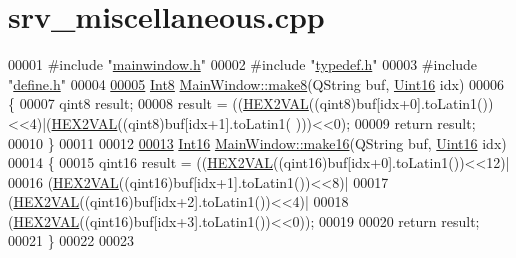 \hypertarget{a00135_source}{\section{srv\+\_\+miscellaneous.\+cpp}
\label{a00135_source}
}

\begin{DoxyCode}
00001 \textcolor{preprocessor}{#include "\hyperlink{a00110}{mainwindow.h}"}
00002 \textcolor{preprocessor}{#include "\hyperlink{a00004}{typedef.h}"}
00003 \textcolor{preprocessor}{#include "\hyperlink{a00090}{define.h}"}
00004 
\hypertarget{a00135_source_l00005}{}\hyperlink{a00017_aebce94d5e6af7afff661daf74b208de1}{00005} \hyperlink{a00004_aafb609548b1aa0152c46f9205b79d0f0}{Int8} \hyperlink{a00017_aebce94d5e6af7afff661daf74b208de1}{MainWindow::make8}(QString buf, \hyperlink{a00004_aae7407b021d43f7193a81a58cfb3e297}{Uint16} idx)
00006 \{
00007     qint8 result;
00008     result = ((\hyperlink{a00090_a428b04d2e2f2da2ea031a6c731660a71}{HEX2VAL}((qint8)buf[idx+0].toLatin1())<<4)|(\hyperlink{a00090_a428b04d2e2f2da2ea031a6c731660a71}{HEX2VAL}((qint8)buf[idx+1].toLatin1(
      )))<<0);
00009     \textcolor{keywordflow}{return} result;
00010 \}
00011 
00012 
\hypertarget{a00135_source_l00013}{}\hyperlink{a00017_afcb06d9f3a6a555df9355af1dfbb4e21}{00013} \hyperlink{a00004_a3985266aecb120f269789241c170850c}{Int16}  \hyperlink{a00017_afcb06d9f3a6a555df9355af1dfbb4e21}{MainWindow::make16}(QString buf, \hyperlink{a00004_aae7407b021d43f7193a81a58cfb3e297}{Uint16} idx)
00014 \{
00015     qint16 result = ((\hyperlink{a00090_a428b04d2e2f2da2ea031a6c731660a71}{HEX2VAL}((qint16)buf[idx+0].toLatin1())<<12)|
00016             (\hyperlink{a00090_a428b04d2e2f2da2ea031a6c731660a71}{HEX2VAL}((qint16)buf[idx+1].toLatin1())<<8)|
00017             (\hyperlink{a00090_a428b04d2e2f2da2ea031a6c731660a71}{HEX2VAL}((qint16)buf[idx+2].toLatin1())<<4)|
00018             (\hyperlink{a00090_a428b04d2e2f2da2ea031a6c731660a71}{HEX2VAL}((qint16)buf[idx+3].toLatin1())<<0));
00019 
00020     \textcolor{keywordflow}{return} result;
00021 \}
00022 
00023 
\end{DoxyCode}

